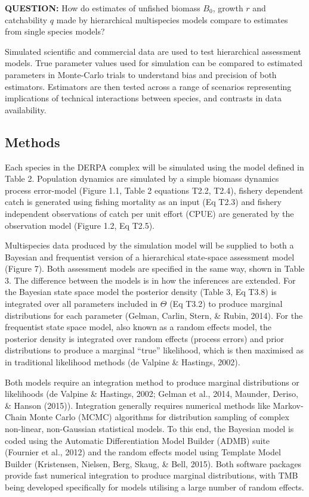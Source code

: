 \documentclass[12pt,]{scrartcl}
\begin{document}
\textbf{QUESTION:} How do estimates of unfished biomass \(B_0\), growth
\(r\) and catchability \(q\) made by hierarchical multispecies models
compare to estimates from single species models?

Simulated scientific and commercial data are used to test hierarchical
assessment models. True parameter values used for simulation can be
compared to estimated parameters in Monte-Carlo trials to understand
bias and precision of both estimators. Estimators are then tested across
a range of scenarios representing implications of technical interactions
between species, and contrasts in data availability.

\subsection{Methods}\label{methods}

Each species in the DERPA complex will be simulated using the model
defined in Table 2. Population dynamics are simulated by a simple
biomass dynamics process error-model (Figure 1.1, Table 2 equations
T2.2, T2.4), fishery dependent catch is generated using fishing
mortality as an input (Eq T2.3) and fishery independent observations of
catch per unit effort (CPUE) are generated by the observation model
(Figure 1.2, Eq T2.5).

Multispecies data produced by the simulation model will be supplied to
both a Bayesian and frequentist version of a hierarchical state-space
assessment model (Figure 7). Both assessment models are specified in the
same way, shown in Table 3. The difference between the models is in how
the inferences are extended. For the Bayesian state space model the
posterior density (Table 3, Eq T3.8) is integrated over all parameters
included in \(\Theta\) (Eq T3.2) to produce marginal distributions for
each parameter (Gelman, Carlin, Stern, \& Rubin, 2014). For the
frequentist state space model, also known as a random effects model, the
posterior density is integrated over random effects (process errors) and
prior distributions to produce a marginal ``true'' likelihood, which is
then maximised as in traditional likelihood methods (de Valpine \&
Hastings, 2002).

Both models require an integration method to produce marginal
distributions or likelihoods (de Valpine \& Hastings, 2002; Gelman et
al., 2014, Maunder, Deriso, \& Hanson (2015)). Integration generally
requires numerical methods like Markov-Chain Monte Carlo (MCMC)
algorithms for distribution sampling of complex non-linear, non-Gaussian
statistical models. To this end, the Bayesian model is coded using the
Automatic Differentiation Model Builder (ADMB) suite (Fournier et al.,
2012) and the random effects model using Template Model Builder
(Kristensen, Nielsen, Berg, Skaug, \& Bell, 2015). Both software
packages provide fast numerical integration to produce marginal
distributions, with TMB being developed specifically for models
utilising a large number of random effects.
\end{document}
